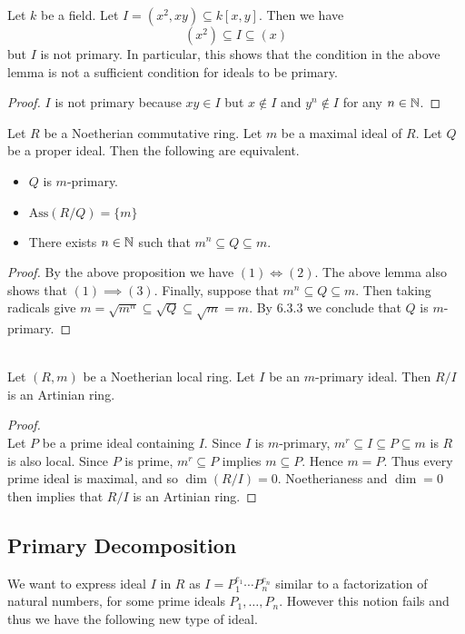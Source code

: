 \documentclass[a4paper]{article}
\begin{document}
\begin{eg}{}{} Let $k$ be a field. Let $I=(x^2,xy)\subseteq k[x,y]$. Then we have $$(x^2)\subseteq I\subseteq(x)$$ but $I$ is not primary. In particular, this shows that the condition in the above lemma is not a sufficient condition for ideals to be primary. 
\begin{proof}
$I$ is not primary because $xy\in I$ but $x\notin I$ and $y^n\notin I$ for any $n\in\mathbb{N}$. 
\end{proof}
\end{eg}

\begin{crl}{}{} Let $R$ be a Noetherian commutative ring. Let $m$ be a maximal ideal of $R$. Let $Q$ be a proper ideal. Then the following are equivalent. 
\begin{itemize}
\item $Q$ is $m$-primary. 
\item $\text{Ass}(R/Q)=\{m\}$
\item There exists $n\in\mathbb{N}$ such that $m^n\subseteq Q\subseteq m$. 
\end{itemize} 
\begin{proof}
By the above proposition we have $(1)\iff(2)$. The above lemma also shows that $(1)\implies(3)$. Finally, suppose that $m^n\subseteq Q\subseteq m$. Then taking radicals give $m=\sqrt{m^n}\subseteq\sqrt{Q}\subseteq\sqrt{m}=m$. By 6.3.3 we conclude that $Q$ is $m$-primary. 
\end{proof}
\end{crl}

\begin{lmm}{}{}\\
Let $(R,m)$ be a Noetherian local ring. Let $I$ be an $m$-primary ideal. Then $R/I$ is an Artinian ring. 
\begin{proof}\\
Let $P$ be a prime ideal containing $I$. Since $I$ is $m$-primary, $m^r\subseteq I\subseteq P\subseteq m$ is $R$ is also local. Since $P$ is prime, $m^r\subseteq P$ implies $m\subseteq P$. Hence $m=P$. Thus every prime ideal is maximal, and so $\dim(R/I)=0$. Noetherianess and $\dim=0$ then implies that $R/I$ is an Artinian ring. 
\end{proof}
\end{lmm}

\subsection{Primary Decomposition}
We want to express ideal $I$ in $R$ as $I=P_1^{e_1}\cdots P_n^{e_n}$ similar to a factorization of natural numbers, for some prime ideals $P_1,\dots,P_n$. However this notion fails and thus we have the following new type of ideal. 
\end{document}

